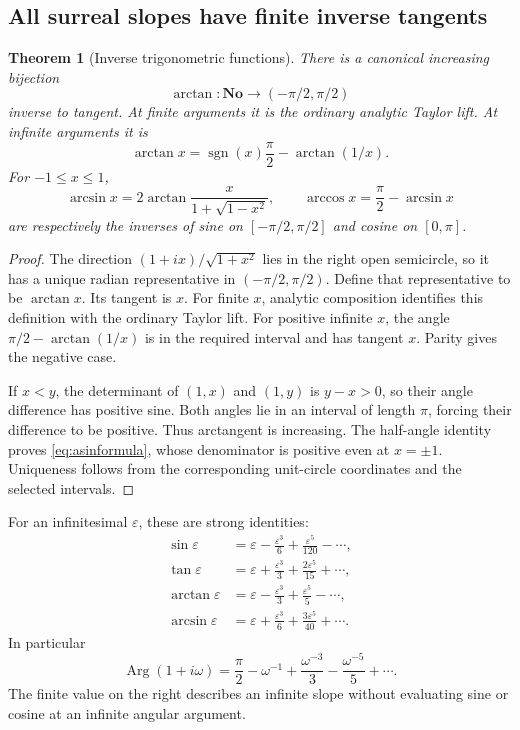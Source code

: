 \documentclass[11pt,letterpaper]{article}
\newtheorem{theorem}{Theorem}[section]
\theoremstyle{definition}
\theoremstyle{remark}
\newcommand{\No}{\mathbf{No}}
\newcommand{\Arg}{\operatorname{Arg}}
\newcommand{\arcs}{\operatorname{arcsin}}
\newcommand{\arcc}{\operatorname{arccos}}
\newcommand{\arct}{\operatorname{arctan}}
\newcommand{\sgn}{\operatorname{sgn}}
\numberwithin{equation}{section}
\begin{document}
\subsection{All surreal slopes have finite inverse tangents}
\begin{theorem}[Inverse trigonometric functions]\label{thm:inverse}
There is a canonical increasing bijection
\[
 \arct:\No\longrightarrow(-\pi/2,\pi/2)
\]
inverse to tangent. At finite arguments it is the ordinary analytic Taylor lift. At infinite arguments it is
\begin{equation}\label{eq:ataninfinite}
 \arct x=\sgn(x)\frac\pi2-\arct(1/x).
\end{equation}
For $-1\le x\le1$,
\begin{equation}\label{eq:asinformula}
 \arcs x=2\arct\frac{x}{1+\sqrt{1-x^2}},
 \qquad \arcc x=\frac\pi2-\arcs x
\end{equation}
are respectively the inverses of sine on $[-\pi/2,\pi/2]$ and cosine on $[0,\pi]$.
\end{theorem}
\begin{proof}
The direction $(1+ix)/\sqrt{1+x^2}$ lies in the right open semicircle, so it has a unique radian representative in $(-\pi/2,\pi/2)$. Define that representative to be $\arct x$. Its tangent is $x$. For finite $x$, analytic composition identifies this definition with the ordinary Taylor lift. For positive infinite $x$, the angle $\pi/2-\arct(1/x)$ is in the required interval and has tangent $x$. Parity gives the negative case.

If $x<y$, the determinant of $(1,x)$ and $(1,y)$ is $y-x>0$, so their angle difference has positive sine. Both angles lie in an interval of length $\pi$, forcing their difference to be positive. Thus arctangent is increasing. The half-angle identity proves \eqref{eq:asinformula}, whose denominator is positive even at $x=\pm1$. Uniqueness follows from the corresponding unit-circle coordinates and the selected intervals.
\end{proof}

For an infinitesimal $\varepsilon$, these are strong identities:
\begin{align}
 \sin\varepsilon&=\varepsilon-\frac{\varepsilon^3}{6}
                  +\frac{\varepsilon^5}{120}-\cdots,\label{eq:smallseries}\\
 \tan\varepsilon&=\varepsilon+\frac{\varepsilon^3}{3}
                  +\frac{2\varepsilon^5}{15}+\cdots,\nonumber\\
 \arct\varepsilon&=\varepsilon-\frac{\varepsilon^3}{3}
                  +\frac{\varepsilon^5}{5}-\cdots,\nonumber\\
 \arcs\varepsilon&=\varepsilon+\frac{\varepsilon^3}{6}
                  +\frac{3\varepsilon^5}{40}+\cdots.\nonumber
\end{align}
In particular
\[
 \Arg(1+i\omega)=\frac\pi2-\omega^{-1}
       +\frac{\omega^{-3}}3-\frac{\omega^{-5}}5+\cdots.
\]
The finite value on the right describes an infinite slope without evaluating sine or cosine at an infinite angular argument.
\end{document}
